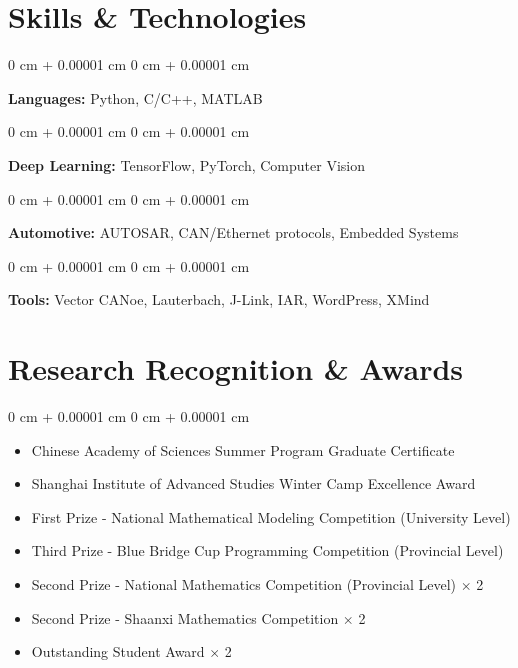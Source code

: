 \documentclass[10pt, a4paper]{article}
\newenvironment{highlights}{
    \begin{itemize}[
        topsep=0.15 cm,
        parsep=0.08 cm,
        partopsep=0pt,
        itemsep=0.05 cm,
        leftmargin=0 cm + 10pt
    ]
}{
    \end{itemize}
} %
\newenvironment{onecolentry}{
    \begin{adjustwidth}{
        0 cm + 0.00001 cm
    }{
        0 cm + 0.00001 cm
    }
}{
    \end{adjustwidth}
} %
\begin{document}
    
    \section{Skills \& Technologies}

        \begin{onecolentry}
            \textbf{Languages:} Python, C/C++, MATLAB
        \end{onecolentry}

        \vspace{0.2 cm}

        \begin{onecolentry}
            \textbf{Deep Learning:} TensorFlow, PyTorch, Computer Vision
        \end{onecolentry}

        \vspace{0.2 cm}

        \begin{onecolentry}
            \textbf{Automotive:} AUTOSAR, CAN/Ethernet protocols, Embedded Systems
        \end{onecolentry}

        \vspace{0.2 cm}

        \begin{onecolentry}
            \textbf{Tools:} Vector CANoe, Lauterbach, J-Link, IAR, WordPress, XMind
        \end{onecolentry}

    \section{Research Recognition \& Awards}

        \begin{onecolentry}
            \begin{highlights}
                \item Chinese Academy of Sciences Summer Program Graduate Certificate
                \item Shanghai Institute of Advanced Studies Winter Camp Excellence Award
                \item First Prize - National Mathematical Modeling Competition (University Level)
                \item Third Prize - Blue Bridge Cup Programming Competition (Provincial Level)
                \item Second Prize - National Mathematics Competition (Provincial Level) $\times$ 2
                \item Second Prize - Shaanxi Mathematics Competition $\times$ 2
                \item Outstanding Student Award $\times$ 2
            \end{highlights}
        \end{onecolentry}


    
\end{document}
